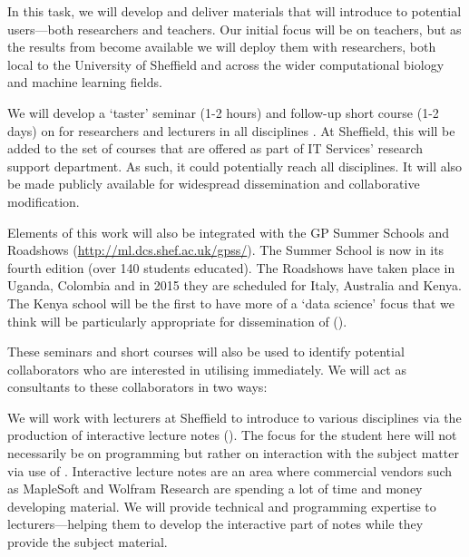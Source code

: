 \begin{workpackage}
\begin{tasklist}
\begin{task}[title=Introduce \TheProject to Researchers and Teachers, id=project-intro,lead=USH,wphases=6-44,PM=20,partners={USO}]

  In this task, we will develop and deliver materials that will introduce \TheProject to
  potential users---both researchers and teachers. Our initial focus will be on teachers,
  but as the results from  become available we will deploy them with
  researchers, both local to the University of Sheffield and across the wider
  computational biology and machine learning fields.

  We will develop a `taster' seminar (1-2 hours) and follow-up short course
  (1-2 days) on \TheProject for researchers and lecturers in all
  disciplines . At Sheffield, this will
  be added to the set of courses that are offered as part of IT
  Services' research support department. As such, it could potentially
  reach all disciplines. It will also be made publicly available for
  widespread dissemination and collaborative modification.

  Elements of this work will also be integrated with the GP Summer
  Schools and Roadshows (\url{http://ml.dcs.shef.ac.uk/gpss/}). The
  Summer School is now in its fourth edition (over 140 students
  educated). The Roadshows have taken place in Uganda, Colombia and in
  2015 they are scheduled for Italy, Australia and Kenya. The Kenya
  school will be the first to have more of a `data science' focus that
  we think will be particularly appropriate for dissemination of
  \TheProject ().

  These seminars and short courses will also be used to identify
  potential collaborators who are interested in utilising \TheProject
  immediately. We will act as consultants to these collaborators in
  two ways:

  We will work with lecturers at Sheffield to introduce \TheProject to
  various disciplines via the production of interactive lecture notes
  (). The focus for the student here
  will not necessarily be on programming but rather on interaction
  with the subject matter via use of \TheProject. Interactive lecture
  notes are an area where commercial vendors such as MapleSoft and
  Wolfram Research are spending a lot of time and money developing
  material. We will provide technical and programming expertise to
  lecturers---helping them to develop the interactive part of notes
  while they provide the subject material.


\end{task}
\end{tasklist}
\end{workpackage}
